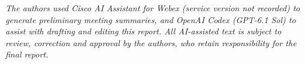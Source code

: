 




\textit{The authors used Cisco AI Assistant for Webex (service version not recorded) to generate preliminary meeting summaries, and OpenAI Codex (GPT-6.1 Sol) to assist with drafting and editing this report. All AI-assisted text is subject to review, correction and approval by the authors, who retain responsibility for the final report. }

